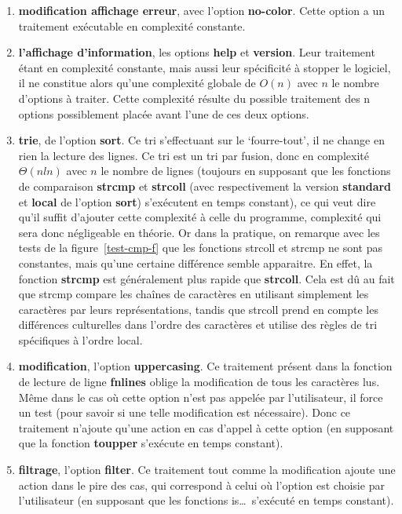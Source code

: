 \documentclass[12pt]{article}
\begin{document}
    \begin{enumerate}
        \item[] \textbf{modification affichage erreur},  avec l'option 
        \textbf{no-color}. Cette option a un traitement exécutable en 
        complexité constante.
        \item[] \textbf{l'affichage d'information}, les options \textbf{help} et 
        \textbf{version}. Leur traitement étant en complexité constante, mais 
        aussi leur spécificité à stopper le logiciel, il ne constitue alors 
        qu'une complexité globale de $O(n)$ avec $n$ le nombre d'options à 
        traiter. Cette complexité résulte du possible traitement des n options 
        possiblement placée avant l'une de ces deux options.
        \item[] \textbf{trie}, de l'option \textbf{sort}. Ce tri s'effectuant 
        sur le `fourre-tout', il ne change en rien la lecture des lignes. Ce tri
        est un tri par fusion, donc en complexité $\Theta(nln)$ avec $n$ le 
        nombre de lignes (toujours en supposant que les fonctions de comparaison 
        \textbf{strcmp} et \textbf{strcoll} (avec respectivement la version 
        \textbf{standard} et \textbf{local} de l'option \textbf{sort}) 
        s'exécutent en temps constant), ce qui veut dire qu'il suffit d'ajouter 
        cette complexité à celle du programme, complexité qui sera donc 
        négligeable en théorie. Or dans la pratique, on remarque avec les tests 
        de la figure~\ref{test-cmp-f} que les fonctions strcoll et strcmp ne 
        sont pas constantes, mais qu'une certaine différence semble apparaitre.
        En effet, la fonction \textbf{strcmp} est généralement plus rapide que 
        \textbf{strcoll}. Cela est dû au fait que strcmp compare les chaînes de 
        caractères en utilisant simplement les caractères par leurs
        représentations, tandis que strcoll prend en compte les différences 
        culturelles dans l'ordre des caractères et utilise des règles de tri 
        spécifiques à l'ordre local.        
        \item[] \textbf{modification}, l'option \textbf{uppercasing}. Ce 
        traitement présent dans la fonction de lecture de ligne \textbf{fnlines} 
        oblige la modification de tous les caractères lus. Même dans le cas où 
        cette option n'est pas appelée par l'utilisateur, il force un test 
        (pour savoir si une telle modification est nécessaire). Donc ce 
        traitement n'ajoute qu'une action en cas d'appel à cette option (en 
        supposant que la fonction \textbf{toupper} s'exécute en temps constant).
        \item[] \textbf{filtrage}, l'option \textbf{filter}. Ce traitement tout 
        comme la modification ajoute une action dans le pire des cas, qui 
        correspond à celui où l'option est choisie par l'utilisateur (en 
        supposant que les fonctions is\ldots~s'exécuté en temps constant). 
    \end{enumerate}
\end{document}
